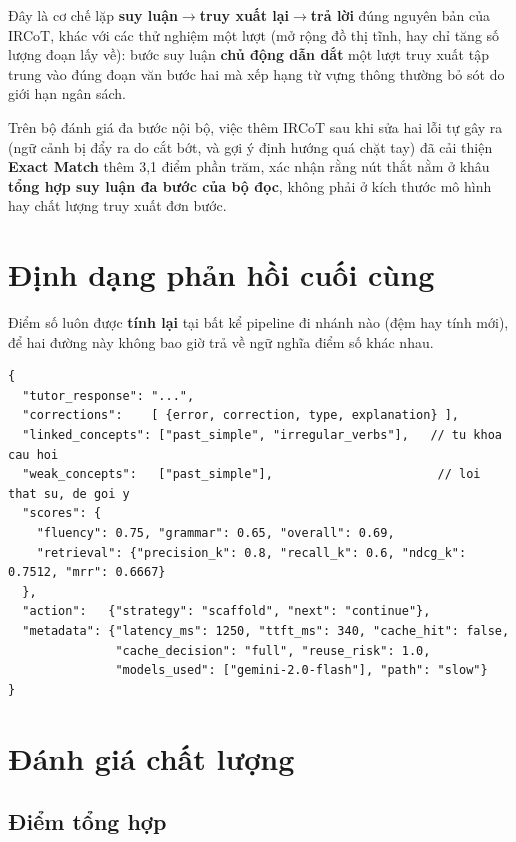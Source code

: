 \begin{luuy}
Đây là cơ chế lặp \textbf{suy luận$\rightarrow$truy xuất lại$\rightarrow$trả lời} đúng
nguyên bản của IRCoT, khác với các thử nghiệm một lượt (mở rộng đồ thị tĩnh, hay chỉ tăng
số lượng đoạn lấy về): bước suy luận \textbf{chủ động dẫn dắt} một lượt truy xuất tập
trung vào đúng đoạn văn bước hai mà xếp hạng từ vựng thông thường bỏ sót do giới hạn ngân
sách.
\end{luuy}

Trên bộ đánh giá đa bước nội bộ, việc thêm IRCoT sau khi sửa hai lỗi tự gây ra (ngữ cảnh
bị đẩy ra do cắt bớt, và gợi ý định hướng quá chặt tay) đã cải thiện \textbf{Exact Match}
thêm 3,1 điểm phần trăm, xác nhận rằng nút thắt nằm ở khâu \textbf{tổng hợp suy luận đa
bước của bộ đọc}, không phải ở kích thước mô hình hay chất lượng truy xuất đơn bước.

\section{Định dạng phản hồi cuối cùng}

Điểm số luôn được \textbf{tính lại} tại  bất kể pipeline đi
nhánh nào (đệm hay tính mới), để hai đường này không bao giờ trả về ngữ nghĩa điểm số
khác nhau.

\begin{lstlisting}
{
  "tutor_response": "...",
  "corrections":    [ {error, correction, type, explanation} ],
  "linked_concepts": ["past_simple", "irregular_verbs"],   // tu khoa cau hoi
  "weak_concepts":   ["past_simple"],                       // loi that su, de goi y
  "scores": {
    "fluency": 0.75, "grammar": 0.65, "overall": 0.69,
    "retrieval": {"precision_k": 0.8, "recall_k": 0.6, "ndcg_k": 0.7512, "mrr": 0.6667}
  },
  "action":   {"strategy": "scaffold", "next": "continue"},
  "metadata": {"latency_ms": 1250, "ttft_ms": 340, "cache_hit": false,
               "cache_decision": "full", "reuse_risk": 1.0,
               "models_used": ["gemini-2.0-flash"], "path": "slow"}
}
\end{lstlisting}

\section{Đánh giá chất lượng}

\subsection{Điểm tổng hợp}

